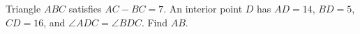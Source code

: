 Triangle $ABC$ satisfies $AC-BC=7$. An interior point $D$ has $AD=14$, $BD=5$, $CD=16$, and $\angle ADC=\angle BDC$. Find $AB$.
